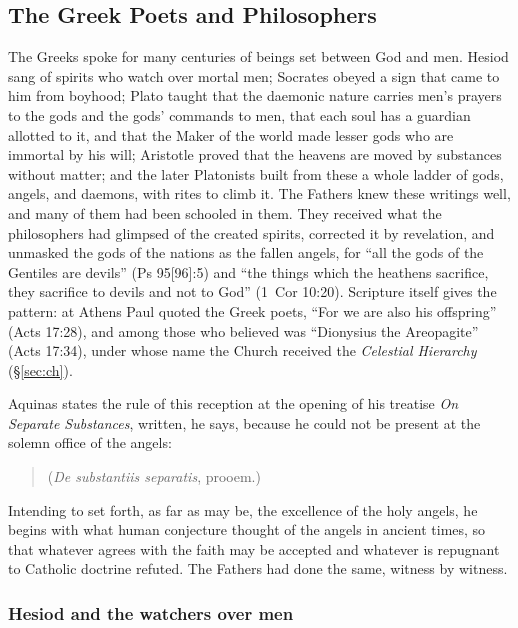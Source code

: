 \sectionguard\subsection{The Greek Poets and Philosophers}\label{sec:bc-greeks}

The Greeks spoke for many centuries of beings set between God and men.
Hesiod sang of spirits who watch over mortal men; Socrates obeyed a sign
that came to him from boyhood; Plato taught that the daemonic nature
carries men's prayers to the gods and the gods' commands to men, that
each soul has a guardian allotted to it, and that the Maker of the world
made lesser gods who are immortal by his will; Aristotle proved that the
heavens are moved by substances without matter; and the later Platonists
built from these a whole ladder of gods, angels, and daemons, with rites
to climb it. The Fathers knew these writings well, and many of them
had been schooled in them. They received what the philosophers had
glimpsed of the created spirits, corrected it by revelation, and
unmasked the gods of the nations as the fallen angels, for ``all the
gods of the Gentiles are devils'' (Ps 95[96]:5) and ``the things which
the heathens sacrifice, they sacrifice to devils and not to God'' (1~Cor
10:20). Scripture itself gives the pattern: at Athens Paul quoted the
Greek poets, ``For we are also his offspring'' (Acts 17:28), and among
those who believed was ``Dionysius the Areopagite'' (Acts 17:34), under
whose name the Church received the \emph{Celestial Hierarchy}
(\S\ref{sec:ch}).

Aquinas states the rule of this reception at the opening of his treatise
\emph{On Separate Substances}, written, he says, because he could not be
present at the solemn office of the angels:
\begin{quote}
(\emph{De substantiis separatis}, prooem.)
\end{quote}
Intending to set forth, as far as may be, the excellence of the holy
angels, he begins with what human conjecture thought of the angels in
ancient times, so that whatever agrees with the faith may be accepted and
whatever is repugnant to Catholic doctrine refuted. The Fathers had done
the same, witness by witness.

\subsubsection{Hesiod and the watchers over men}\label{sec:bc-hesiod}

